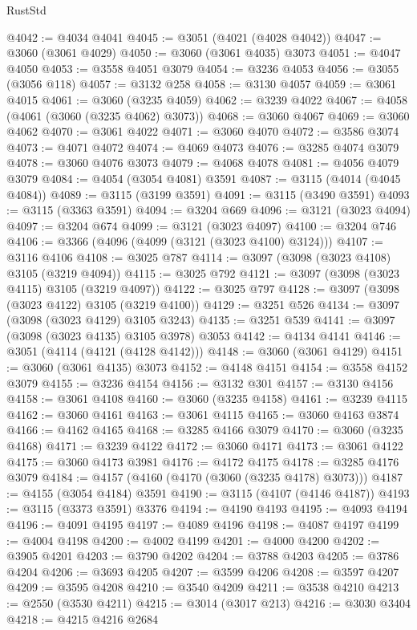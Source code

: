 \begin{lexlean}{RustStd}
\begin{coremodule}
{\begin{coremodule}
{{{{{{{{{{{{{{{{{{{{{{{{{{{{{{{{@4042 := @4034 @4041
@4045 := @3051 (@4021 (@4028 @4042))
@4047 := @3060 (@3061 @4029)
@4050 := @3060 (@3061 @4035) @3073
@4051 := @4047 @4050
@4053 := @3558 @4051 @3079
@4054 := @3236 @4053
@4056 := @3055 (@3056 @118)
@4057 := @3132 @258
@4058 := @3130 @4057
@4059 := @3061 @4015
@4061 := @3060 (@3235 @4059)
@4062 := @3239 @4022
@4067 := @4058 (@4061 (@3060 (@3235 @4062) @3073))
@4068 := @3060 @4067
@4069 := @3060 @4062
@4070 := @3061 @4022
@4071 := @3060 @4070
@4072 := @3586 @3074
@4073 := @4071 @4072
@4074 := @4069 @4073
@4076 := @3285 @4074 @3079
@4078 := @3060 @4076 @3073
@4079 := @4068 @4078
@4081 := @4056 @4079 @3079
@4084 := @4054 (@3054 @4081) @3591
@4087 := @3115 (@4014 (@4045 @4084))
@4089 := @3115 (@3199 @3591)
@4091 := @3115 (@3490 @3591)
@4093 := @3115 (@3363 @3591)
@4094 := @3204 @669
@4096 := @3121 (@3023 @4094)
@4097 := @3204 @674
@4099 := @3121 (@3023 @4097)
@4100 := @3204 @746
@4106 := @3366 (@4096 (@4099 (@3121 (@3023 @4100) @3124)))
@4107 := @3116 @4106
@4108 := @3025 @787
@4114 := @3097 (@3098 (@3023 @4108) @3105 (@3219 @4094))
@4115 := @3025 @792
@4121 := @3097 (@3098 (@3023 @4115) @3105 (@3219 @4097))
@4122 := @3025 @797
@4128 := @3097 (@3098 (@3023 @4122) @3105 (@3219 @4100))
@4129 := @3251 @526
@4134 := @3097 (@3098 (@3023 @4129) @3105 @3243)
@4135 := @3251 @539
@4141 := @3097 (@3098 (@3023 @4135) @3105 @3978) @3053
@4142 := @4134 @4141
@4146 := @3051 (@4114 (@4121 (@4128 @4142)))
@4148 := @3060 (@3061 @4129)
@4151 := @3060 (@3061 @4135) @3073
@4152 := @4148 @4151
@4154 := @3558 @4152 @3079
@4155 := @3236 @4154
@4156 := @3132 @301
@4157 := @3130 @4156
@4158 := @3061 @4108
@4160 := @3060 (@3235 @4158)
@4161 := @3239 @4115
@4162 := @3060 @4161
@4163 := @3061 @4115
@4165 := @3060 @4163 @3874
@4166 := @4162 @4165
@4168 := @3285 @4166 @3079
@4170 := @3060 (@3235 @4168)
@4171 := @3239 @4122
@4172 := @3060 @4171
@4173 := @3061 @4122
@4175 := @3060 @4173 @3981
@4176 := @4172 @4175
@4178 := @3285 @4176 @3079
@4184 := @4157 (@4160 (@4170 (@3060 (@3235 @4178) @3073)))
@4187 := @4155 (@3054 @4184) @3591
@4190 := @3115 (@4107 (@4146 @4187))
@4193 := @3115 (@3373 @3591) @3376
@4194 := @4190 @4193
@4195 := @4093 @4194
@4196 := @4091 @4195
@4197 := @4089 @4196
@4198 := @4087 @4197
@4199 := @4004 @4198
@4200 := @4002 @4199
@4201 := @4000 @4200
@4202 := @3905 @4201
@4203 := @3790 @4202
@4204 := @3788 @4203
@4205 := @3786 @4204
@4206 := @3693 @4205
@4207 := @3599 @4206
@4208 := @3597 @4207
@4209 := @3595 @4208
@4210 := @3540 @4209
@4211 := @3538 @4210
@4213 := @2550 (@3530 @4211)
@4215 := @3014 (@3017 @213)
@4216 := @3030 @3404
@4218 := @4215 @4216 @2684
}}}}}}}}}}}}}}}}}}}}}}}}}}}}}}}}
\end{coremodule}}
\end{coremodule}
\end{lexlean}

